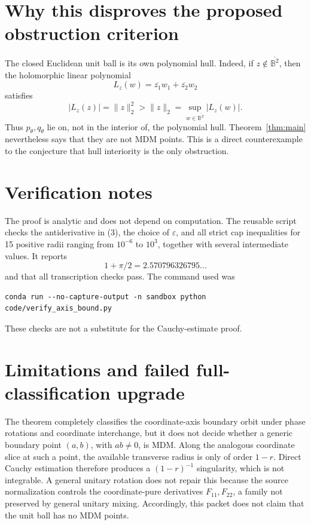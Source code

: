 \documentclass[11pt]{article}
\newcommand{\B}{\mathbb B}
\begin{document}
\section*{Why this disproves the proposed obstruction criterion}

The closed Euclidean unit ball is its own polynomial hull.  Indeed, if
\(z\notin\overline{\B^2}\), then the holomorphic linear polynomial
\[
 L_z(w)=\overline{z_1}w_1+\overline{z_2}w_2
\]
satisfies
\[
 |L_z(z)|=\|z\|_2^2>
 \|z\|_2=\sup_{w\in\overline{\B^2}}|L_z(w)|.
\]
Thus \(p_\theta,q_\theta\) lie on, not in the interior of, the polynomial
hull.  Theorem~\ref{thm:main} nevertheless says that they are not MDM points.
This is a direct counterexample to the conjecture that hull interiority is the
only obstruction.

\section*{Verification notes}

The proof is analytic and does not depend on computation.  The reusable script
 checks the antiderivative in (3), the
choice of \(\varepsilon\), and all strict cap inequalities for 15 positive
radii ranging from \(10^{-6}\) to \(10^3\), together with several intermediate
values.  It reports
\[
 1+\pi/2=2.570796326795\ldots
\]
and that all transcription checks pass.  The command used was
\begin{verbatim}
conda run --no-capture-output -n sandbox python code/verify_axis_bound.py
\end{verbatim}
These checks are not a substitute for the Cauchy-estimate proof.

\section*{Limitations and failed full-classification upgrade}

The theorem completely classifies the coordinate-axis boundary orbit under
phase rotations and coordinate interchange, but it does not decide whether a
generic boundary point \((a,b)\), with \(ab\ne0\), is MDM.  Along the analogous
coordinate slice at such a point, the available transverse radius is only of
order \(1-r\).  Direct Cauchy estimation therefore produces a
\((1-r)^{-1}\) singularity, which is not integrable.  A general unitary rotation
does not repair this because the source normalization controls the
coordinate-pure derivatives \(F_{11},F_{22}\), a family not preserved by
general unitary mixing.  Accordingly, this packet does not claim that the
unit ball has no MDM points.
\end{document}
